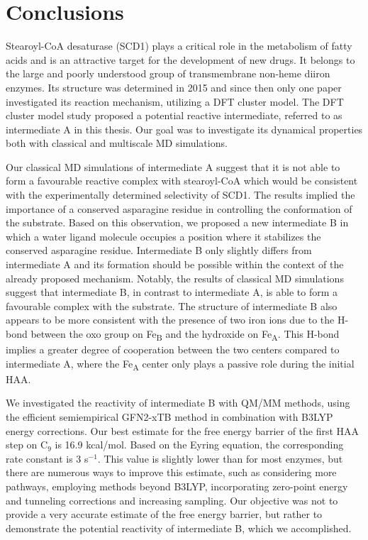 \chapter{Conclusions}

Stearoyl-CoA desaturase (SCD1) plays a critical role in the metabolism of fatty acids and is an attractive target for the development of new drugs. It belongs to the large and poorly understood group of transmembrane non-heme diiron enzymes. Its structure was determined in 2015 and since then only one paper investigated its reaction mechanism, utilizing a DFT cluster model. The DFT cluster model study proposed a potential reactive intermediate, referred to as intermediate A in this thesis. Our goal was to investigate its dynamical properties both with classical and multiscale MD simulations.

Our classical MD simulations of intermediate A suggest that it is not able to form a favourable reactive complex with stearoyl-CoA which would be consistent with the experimentally determined selectivity of SCD1. The results implied the importance of a conserved asparagine residue in controlling the conformation of the substrate. Based on this observation, we proposed a new intermediate B in which a water ligand molecule occupies a position where it stabilizes the conserved asparagine residue. Intermediate B only slightly differs from intermediate A and its formation should be possible within the context of the already proposed mechanism. Notably, the results of classical MD simulations suggest that intermediate B, in contrast to intermediate A, is able to form a favourable complex with the substrate. The structure of intermediate B also appears to be more consistent with the presence of two iron ions due to the H-bond between the oxo group on Fe\textsubscript{B} and the hydroxide on Fe\textsubscript{A}. This H-bond implies a greater degree of cooperation between the two centers compared to intermediate A, where the Fe\textsubscript{A} center only plays a passive role during the initial HAA.

We investigated the reactivity of intermediate B with QM/MM methods, using the efficient semiempirical GFN2-xTB method in combination with B3LYP energy corrections. Our best estimate for the free energy barrier of the first HAA step on C$_{9}$ is 16.9 kcal/mol. Based on the Eyring equation, the corresponding rate constant is 3 s$^{-1}$. This value is slightly lower than for most enzymes, but there are numerous ways to improve this estimate, such as considering more pathways, employing methods beyond B3LYP, incorporating zero-point energy and tunneling corrections and increasing sampling. Our objective was not to provide a very accurate estimate of the free energy barrier, but rather to demonstrate the potential reactivity of intermediate B, which we accomplished.

